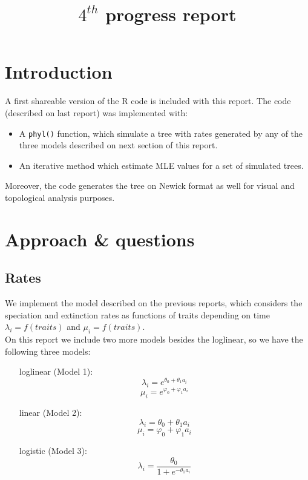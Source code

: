 \documentclass[11pt]{article} %
\title{$4^{th}$ progress report}
\begin{document}
\maketitle
\section{Introduction}

 A first shareable version of the R code is included with this report. The code (described on last report) was implemented with: 
 
	\begin{itemize}
		\item A \verb|phyl()| function, which simulate a tree with rates generated by any of the three models described on next section of this report.
		\item An iterative method which estimate MLE values for a set of simulated trees.
 
	\end{itemize}
	
Moreover, the code generates the tree on Newick format as well for visual and topological analysis purposes. 


\section{Approach \& questions}


\subsection{Rates}

 We implement the model described on the previous reports, which considers the speciation and extinction rates as functions of traits depending on time $ \lambda_i = f(traits)$ and $\mu_i = f(traits)$. \\
  
 On this report we include two more models besides the loglinear, so we have the following three models:

\begin{itemize}
	\item[loglinear (Model 1):] 
 		$$\lambda_i = e^{\theta_0 + \theta_1 a_i} $$
		$$ \mu_i = e^{\varphi_0 + \varphi_1 a_i} $$
	\item[linear (Model 2):] 
		$$\lambda_i = \theta_0 + \theta_1 a_i $$
		$$ \mu_i = \varphi_0 + \varphi_1 a_i $$
	\item[logistic (Model 3):]
		$$\lambda_i = \frac{\theta_0}{1+e^{-\theta_1 a_i}}$$
\end{itemize}
\end{document}
